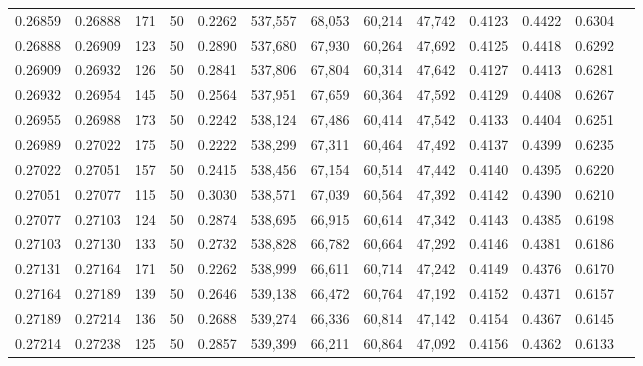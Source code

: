 \begin{tabular}{rrrrrrrrrrrrr}
0.26859 & 0.26888 &   171 &  50 &                                     0.2262 & 537,557 &  68,053 &  60,214 &  47,742 & 0.4123 & 0.4422 & 0.6304 \\
0.26888 & 0.26909 &   123 &  50 &                                     0.2890 & 537,680 &  67,930 &  60,264 &  47,692 & 0.4125 & 0.4418 & 0.6292 \\
0.26909 & 0.26932 &   126 &  50 &                                     0.2841 & 537,806 &  67,804 &  60,314 &  47,642 & 0.4127 & 0.4413 & 0.6281 \\
0.26932 & 0.26954 &   145 &  50 &                                     0.2564 & 537,951 &  67,659 &  60,364 &  47,592 & 0.4129 & 0.4408 & 0.6267 \\
0.26955 & 0.26988 &   173 &  50 &                                     0.2242 & 538,124 &  67,486 &  60,414 &  47,542 & 0.4133 & 0.4404 & 0.6251 \\
0.26989 & 0.27022 &   175 &  50 &                                     0.2222 & 538,299 &  67,311 &  60,464 &  47,492 & 0.4137 & 0.4399 & 0.6235 \\
0.27022 & 0.27051 &   157 &  50 &                                     0.2415 & 538,456 &  67,154 &  60,514 &  47,442 & 0.4140 & 0.4395 & 0.6220 \\
0.27051 & 0.27077 &   115 &  50 &                                     0.3030 & 538,571 &  67,039 &  60,564 &  47,392 & 0.4142 & 0.4390 & 0.6210 \\
0.27077 & 0.27103 &   124 &  50 &                                     0.2874 & 538,695 &  66,915 &  60,614 &  47,342 & 0.4143 & 0.4385 & 0.6198 \\
0.27103 & 0.27130 &   133 &  50 &                                     0.2732 & 538,828 &  66,782 &  60,664 &  47,292 & 0.4146 & 0.4381 & 0.6186 \\
0.27131 & 0.27164 &   171 &  50 &                                     0.2262 & 538,999 &  66,611 &  60,714 &  47,242 & 0.4149 & 0.4376 & 0.6170 \\
0.27164 & 0.27189 &   139 &  50 &                                     0.2646 & 539,138 &  66,472 &  60,764 &  47,192 & 0.4152 & 0.4371 & 0.6157 \\
0.27189 & 0.27214 &   136 &  50 &                                     0.2688 & 539,274 &  66,336 &  60,814 &  47,142 & 0.4154 & 0.4367 & 0.6145 \\
0.27214 & 0.27238 &   125 &  50 &                                     0.2857 & 539,399 &  66,211 &  60,864 &  47,092 & 0.4156 & 0.4362 & 0.6133 \\

\end{tabular}
